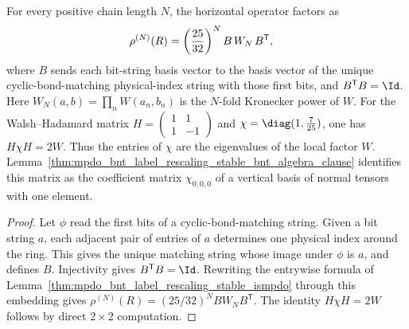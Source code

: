 \begin{lemma}%
    \label{thm:mpdo_bnt_label_rescaling_stable_chi_attachment}
    \leanok
    For every positive chain length $N$, the horizontal operator factors as
    \begin{align}
        \rho^{(N)}(R) & =\left(\frac{25}{32}\right)^N B\,W_N\,B^{\mathsf T},
        \notag
    \end{align}
    where $B$ sends each bit-string basis vector to the basis vector of the
    unique cyclic-bond-matching physical-index string with those first bits,
    and $B^{\mathsf T}B=\Id$. Here
    $W_N(a,b)=\prod_n W(a_n,b_n)$ is the $N$-fold Kronecker power of $W$.
    For the Walsh--Hadamard matrix
    $H=\begin{pmatrix}1&1\\1&-1\end{pmatrix}$ and
    $\chi=\diag(1,\tfrac{7}{25})$, one has $H\chi H=2W$.
    Thus the entries of $\chi$ are the eigenvalues of the local factor $W$.
    Lemma~\ref{thm:mpdo_bnt_label_rescaling_stable_bnt_algebra_clause}
    identifies this matrix as the coefficient matrix
    $\chi_{0,0,0}$ of a vertical basis of normal tensors with one element.
\end{lemma}
\begin{proof}\leanok
    Let $\phi$ read the first bits of a cyclic-bond-matching string.
    Given a bit string $a$, each adjacent pair of entries of $a$ determines
    one physical index around the ring. This gives the unique matching
    string whose image under $\phi$ is $a$, and defines $B$.
    Injectivity gives $B^{\mathsf T}B=\Id$. Rewriting the entrywise formula
    of Lemma~\ref{thm:mpdo_bnt_label_rescaling_stable_ismpdo} through this
    embedding gives
    $\rho^{(N)}(R)=(25/32)^N B W_N B^{\mathsf T}$.
    The identity $H\chi H=2W$ follows by direct $2\times2$ computation.
\end{proof}

